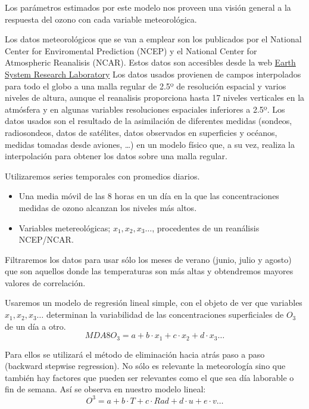 \documentclass[12pt]{article}
\begin{document}
Los parámetros estimados por este modelo nos proveen una visión general  a la respuesta del ozono con cada variable meteorológica. 

Los datos meteorológicos que se van a emplear son los publicados por el National Center for Enviromental Prediction (NCEP) y el National Center for Atmospheric Reanalisis (NCAR). Estos datos son accesibles desde la web \href{https://www.esrl.noaa.gov/}{Earth System Research Laboratory} %
Los datos usados provienen de campos interpolados para todo el globo a una malla regular de 2.5º de resolución espacial y varios niveles de altura, aunque el reanalisis proporciona hasta 17 niveles verticales en la atmósfera y en algunas variables resoluciones espaciales inferiores a 2.5º\citep{ncar}. Los datos usados son el resultado de la asimilación de diferentes medidas (sondeos, radiosondeos, datos de satélites, datos observados en superficies y océanos, medidas tomadas desde aviones, \ldots) en un modelo físico que, a su vez, realiza la interpolación para obtener los datos sobre una malla regular. 


Utilizaremos series temporales con promedios diarios. 
\begin{itemize}
\item Una media móvil de las 8 horas en un día en la que las concentraciones medidas de ozono alcanzan los niveles más altos.
\item Variables metereológicas; $x_1,x_2,x_3\ldots$, procedentes de un reanálisis NCEP/NCAR.
\end{itemize}

Filtraremos los datos para usar sólo los meses de verano (junio, julio y agosto) que son aquellos donde las temperaturas son más altas y obtendremos mayores valores de correlación.

Usaremos un modelo de regresión lineal simple, con el objeto de ver que   variables  $x_1,x_2,x_3\ldots$ determinan la variabilidad de las concentraciones superficiales de $O_3$ de un día a otro. 
\begin{equation}
MDA8  O_3= a + b\cdot x_1 + c \cdot x_2 + d\cdot x_3 \ldots
\end{equation}


Para ellos se utilizará el método de eliminación hacia atrás paso a paso (backward stepwise regression). No sólo es relevante la meteorología sino que también hay factores que pueden ser relevantes como el que sea día laborable o fin de semana. Así  se observa en nuestro modelo lineal:
\begin{equation}
O^3=a + b\cdot T + c \cdot Rad+d\cdot u + e\cdot v \ldots
\end{equation}
\end{document}
